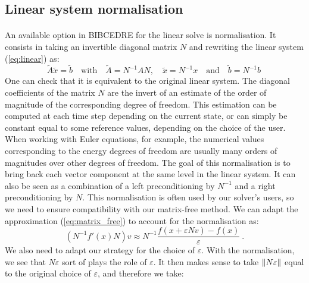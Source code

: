     \subsection{Linear system normalisation}


      \paragraph{}
      An available option in BIBCEDRE for the linear solve is normalisation.
      It consists in taking an invertible diagonal matrix $N$ and rewriting the linear system (\ref{eq:linear}) as:
      \begin{equation}
        \tilde{A}\tilde{x} = \tilde{b}
        \quad\textrm{with}\quad \tilde{A} = N^{-1} A N,
        \quad \tilde{x} = N^{-1} x
        \quad\textrm{and}\quad \tilde{b} = N^{-1} b \
      \end{equation}
      One can check that it is equivalent to the original linear system.
      The diagonal coefficients of the matrix $N$ are the invert of an estimate of the order of magnitude of the corresponding degree of freedom. 
      This estimation can be computed at each time step depending on the current state, or can simply be constant equal to some reference values, depending on the choice of the user.
      When working with Euler equations, for example, the numerical values corresponding to the energy degrees of freedom are usually many orders of magnitudes over other degrees of freedom.
      The goal of this normalisation is to bring back each vector component at the same level in the linear system.
      It can also be seen as a combination of a left preconditioning by $N^{-1}$ and a right preconditioning by $N$.
      This normalisation is often used by our solver's users, so we need to ensure compatibility with our matrix-free method.
      We can adapt the approximation (\ref{eq:matrix_free}) to account for the normalisation as:
      \begin{equation}
        \left( N^{-1} f'\left(x\right) N \right) v \approx N^{-1} \frac{f\left(x + \varepsilon N v\right) - f\left(x\right)}{\varepsilon} \ .
      \end{equation}
      We also need to adapt our strategy for the choice of $\varepsilon$.
      With the normalisation, we see that $N \varepsilon$ sort of plays the role of $\varepsilon$.
      It then makes sense to take $\norm{N \varepsilon}$ equal to the original choice of $\varepsilon$, and therefore we take:
